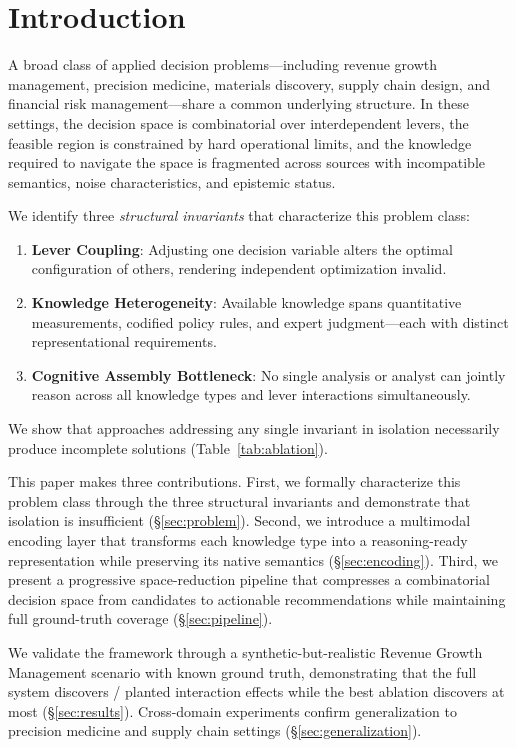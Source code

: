 \section{Introduction}
\label{sec:introduction}

A broad class of applied decision problems---including revenue growth management, precision medicine, materials discovery, supply chain design, and financial risk management---share a common underlying structure.
In these settings, the decision space is combinatorial over interdependent levers, the feasible region is constrained by hard operational limits, and the knowledge required to navigate the space is fragmented across sources with incompatible semantics, noise characteristics, and epistemic status.

We identify three \emph{structural invariants} that characterize this problem class:
\begin{enumerate}
    \item \textbf{Lever Coupling}: Adjusting one decision variable alters the optimal configuration of others, rendering independent optimization invalid.
    \item \textbf{Knowledge Heterogeneity}: Available knowledge spans quantitative measurements, codified policy rules, and expert judgment---each with distinct representational requirements.
    \item \textbf{Cognitive Assembly Bottleneck}: No single analysis or analyst can jointly reason across all knowledge types and lever interactions simultaneously.
\end{enumerate}

We show that approaches addressing any single invariant in isolation necessarily produce incomplete solutions (Table~\ref{tab:ablation}).

This paper makes three contributions.
First, we formally characterize this problem class through the three structural invariants and demonstrate that isolation is insufficient (\S\ref{sec:problem}).
Second, we introduce a multimodal encoding layer that transforms each knowledge type into a reasoning-ready representation while preserving its native semantics (\S\ref{sec:encoding}).
Third, we present a progressive space-reduction pipeline that compresses a combinatorial decision space from \PIPELINEINPUT{} candidates to \PIPELINEOUTPUT{} actionable recommendations while maintaining full ground-truth coverage (\S\ref{sec:pipeline}).

We validate the framework through a synthetic-but-realistic Revenue Growth Management scenario with known ground truth, demonstrating that the full system discovers \EFFECTSDISCOVERED{}/\EFFECTSTOTAL{} planted interaction effects while the best ablation discovers at most \BESTABLATION{} (\S\ref{sec:results}).
Cross-domain experiments confirm generalization to precision medicine and supply chain settings (\S\ref{sec:generalization}).
